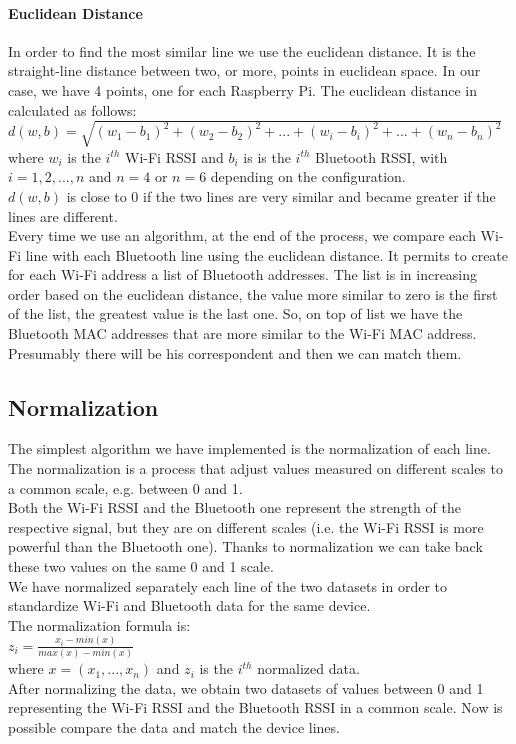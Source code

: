 \paragraph{Euclidean Distance}
In order to find the most similar line we use the euclidean distance. It is the straight-line distance between two, or more, points in euclidean space. In our case, we have 4 points, one for each Raspberry Pi. The euclidean distance in calculated as follows:\\
\(d(w,b) = \sqrt{(w_1 - b_1)^2 + (w_2 - b_2)^2 +... + (w_i - b_i)^2 + ... + (w_n - b_n)^2}\)
where \(w_i\) is the \(i^{th}\) Wi-Fi RSSI and \(b_i\) is  is the \(i^{th}\) Bluetooth RSSI, with \(i = 1, 2, ..., n\) and \(n = 4\) or \( n = 6 \) depending on the configuration.\\
\(d(w,b)\) is close to 0 if the two lines are very similar and became greater if the lines are different.\\
\linebreak
Every time we use an algorithm, at the end of the process, we compare each Wi-Fi line with each Bluetooth line using the euclidean distance. It permits to create for each Wi-Fi address a list of Bluetooth addresses. The list is in increasing order based on the euclidean distance, the value more similar to zero is the first of the list, the greatest value is the last one. So, on top of list we have the Bluetooth MAC addresses that are more similar to the Wi-Fi MAC address. Presumably there will be his correspondent and then we can match them.

\subsection{Normalization}
The simplest algorithm we have implemented is the normalization of each line.\\
The normalization is a process that adjust values measured on different scales to a common scale, e.g. between 0 and 1.\\
Both the Wi-Fi RSSI and the Bluetooth one represent the strength of the respective signal, but they are on different scales (i.e. the Wi-Fi RSSI is more powerful than the Bluetooth one). Thanks to normalization we can take back these two values on the same 0 and 1 scale.\\
\linebreak
We have normalized separately each line of the two datasets in order to standardize Wi-Fi and Bluetooth data for the same device.\\
The normalization formula is:\\
\( z_i = \frac{x_i-min(x)}{max(x)-min(x)} \)\\
where \( x=(x_1,..., x_n)\) and \(z_i\) is the \(i^{th}\) normalized data.\\
\linebreak
After normalizing the data, we obtain two datasets of values between 0 and 1 representing the Wi-Fi RSSI and the Bluetooth RSSI in a common scale. Now is possible compare the data and match the device lines.

